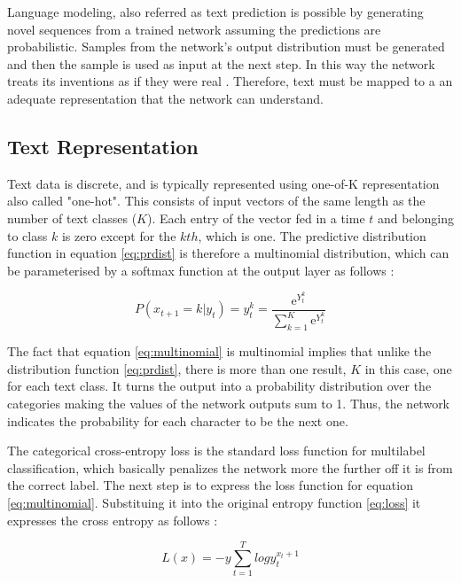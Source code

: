 Language modeling, also referred as text prediction is possible by generating novel sequences from a trained network assuming the predictions are probabilistic. Samples from the network's output distribution must be generated and then the sample is used as input at the next step. In this way the network treats its inventions as if they were real \cite{graves2013generating}. Therefore, text must be mapped to a an adequate representation that the network can understand.

\subsection{Text Representation}
Text data is discrete, and is typically represented using one-of-K representation also called "one-hot". This consists of input vectors of the same length as the number of text classes ($K$). Each entry of the vector fed in a time $t$ and belonging to class $k$ is zero except for the $kth$, which is one. The predictive distribution function in equation \ref{eq:prdist} is therefore a multinomial distribution, which can be parameterised by a softmax function at the output layer as follows \cite{graves2013generating}:

\begin{equation} \label{eq:multinomial}
P(x_{t+1}=k|y_t)=y^k_t=\frac{\mathrm{e}^{Y^k_t}}{ \sum_{k=1}^{K} \mathrm{e}^{Y^k_t}}
\end{equation}

The fact that equation \ref{eq:multinomial} is multinomial implies that unlike the distribution function \ref{eq:prdist}, there is more than one result, $K$ in this case, one for each text class.  It turns the output into a probability distribution over the categories making the values of the network outputs sum to 1. Thus, the network indicates the probability for each character to be the next one.

The categorical cross-entropy loss is the standard loss function for multilabel classification, which basically penalizes the network more the further off it is from the correct label. The next step is to express the loss function for equation \ref{eq:multinomial}. Substituing it into the original entropy function \ref{eq:loss} it expresses the cross entropy as follows \cite{graves2013generating}:

\begin{equation} \label{eq:crossEntropy}
L(x)=-y \sum_{t=1}^{T} log y^{x_t+1}_t
\end{equation}

